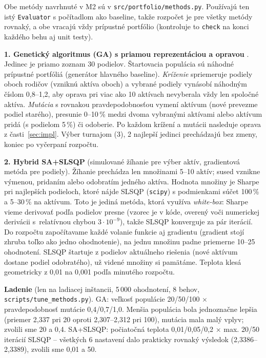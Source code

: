 \documentclass[10pt,a4paper]{article}
\begin{document}
Obe metódy navrhnuté v M2 sú v \texttt{src/portfolio/methods.py}. Používajú ten istý \texttt{Evaluator}
s počítadlom ako baseline, takže rozpočet je pre všetky metódy rovnaký, a obe vracajú vždy prípustné portfólio
(kontroluje to \texttt{check} na konci každého behu aj unit testy).

\textbf{1. Genetický algoritmus (GA) s priamou reprezentáciou a opravou} \cite{chang2000}. Jedinec je
priamo zoznam 30 podielov. Štartovacia populácia sú náhodné prípustné portfóliá (generátor hlavného baseline).
\emph{Kríženie} spriemeruje podiely oboch rodičov (vzniknú aktíva oboch) a vybrané podiely vynásobí
náhodným číslom 0,8--1,2, aby oprava pri viac ako 10 aktívach nevyberala vždy len spoločné aktíva.
\emph{Mutácia} s rovnakou pravdepodobnosťou vymení aktívum (nové prevezme podiel starého), presunie 0--10\,\%
medzi dvoma vybranými aktívami alebo aktívum pridá (s podielom 5\,\%) či odoberie. Po každom krížení a mutácii
nasleduje oprava z časti~\ref{sec:impl}. Výber turnajom (3), 2 najlepší jedinci prechádzajú bez zmeny,
koniec po vyčerpaní rozpočtu.

\textbf{2. Hybrid SA+SLSQP} (simulované žíhanie pre výber aktív, gradientová metóda pre podiely).
Žíhanie prechádza len množinami 5--10 aktív; sused vznikne výmenou, pridaním alebo odobratím jedného aktíva.
Hodnota množiny je Sharpe pri najlepších podieloch, ktoré nájde SLSQP (\texttt{scipy}) s podmienkami
súčet 100\,\% a 5--30\,\% na aktívum. Toto je jediná metóda, ktorá využíva \emph{white-box}: Sharpe vieme derivovať podľa podielov
presne (vzorec je v kóde, overený voči numerickej derivácii s~relatívnou chybou $3\cdot10^{-9}$),
takže SLSQP konverguje za pár iterácií. Do rozpočtu započítavame každé volanie funkcie
aj gradientu (gradient stojí zhruba toľko ako jedno ohodnotenie), na jednu množinu padne priemerne
10--25 ohodnotení. SLSQP štartuje z podielov aktuálneho riešenia (nové aktívum dostane podiel odobratého),
už videné množiny si pamätáme. Teplota klesá geometricky z 0,01 na 0,001 podľa minutého rozpočtu.

\textbf{Ladenie} (len na ladiacej inštancii, 5\,000 ohodnotení, 8 behov, \texttt{scripts/tune\_methods.py}).
GA: veľkosť populácie 20/50/100 $\times$ pravdepodobnosť mutácie 0,4/0,7/1,0. Menšia populácia bola
jednoznačne lepšia (priemer 2,337 pri 20 oproti 2,307--2,312 pri 100), mutácia mala malý vplyv; zvolili sme
20 a 0,4. SA+SLSQP: počiatočná teplota 0,01/0,05/0,2 $\times$ max. 20/50 iterácií SLSQP -- všetkých
6 nastavení dalo prakticky rovnaký výsledok (2,3386--2,3389), zvolili sme 0,01 a 50.
\end{document}
